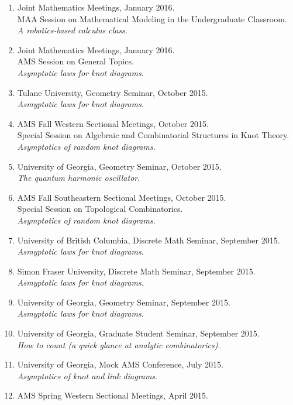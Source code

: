 \documentclass[letterpaper]{article}
\begin{document}
\begin{enumerate}
\item Joint Mathematics Meetings, January 2016.\\
  MAA Session on Mathematical Modeling in the Undergraduate Classroom. \\
  \textit{A robotics-based calculus class}.
\item Joint Mathematics Meetings, January 2016.\\
  AMS Session on General Topics. \\
  \textit{Asymptotic laws for knot diagrams}.
\item Tulane University, Geometry Seminar, October 2015.\\
  \textit{Asmyptotic laws for knot diagrams}.
\item AMS Fall Western Sectional Meetings, October 2015.\\
  Special Session on Algebraic and Combinatorial Structures in Knot Theory. \\
  \textit{Asymptotics of random knot diagrams}.
\item University of Georgia, Geometry Seminar, October 2015.\\
  \textit{The quantum harmonic oscillator}.
\item AMS Fall Southeastern Sectional Meetings, October 2015.\\
  Special Session on Topological Combinatorics. \\
  \textit{Asymptotics of random knot diagrams}.
\item University of British Columbia, Discrete Math Seminar, September 2015.\\
  \textit{Asmyptotic laws for knot diagrams}.
\item Simon Fraser University, Discrete Math Seminar, September 2015.\\
  \textit{Asmyptotic laws for knot diagrams}.
\item University of Georgia, Geometry Seminar, September 2015.\\
  \textit{Asmyptotic laws for knot diagrams}.
\item University of Georgia, Graduate Student Seminar, September 2015.\\
  \textit{How to count (a quick glance at analytic combinatorics)}.
\item University of Georgia, Mock AMS Conference, July 2015.\\
  \textit{Asymptotics of knot and link diagrams}.
\item AMS Spring Western Sectional Meetings, April 2015.\\

\end{enumerate}
\end{document}
